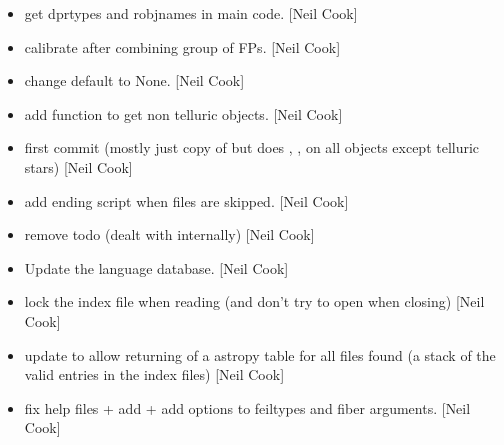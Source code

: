 \documentclass[a4paper,10pt,english]{report}
\begin{document}
\begin{itemize}
\item {} 
 \sphinxhyphen{} get dprtypes and robjnames
in main code. {[}Neil Cook{]}

\item {} 
 \sphinxhyphen{} calibrate after combining group of FPs. {[}Neil
Cook{]}

\item {} 
 \sphinxhyphen{} change default to
None. {[}Neil Cook{]}

\item {} 
 \sphinxhyphen{} add function  to get non
telluric objects. {[}Neil Cook{]}

\item {} 
 \sphinxhyphen{} first commit (mostly just
copy of  but does , ,
 on all objects except telluric stars) {[}Neil Cook{]}

\item {} 
 \sphinxhyphen{} add ending script when files
are skipped. {[}Neil Cook{]}

\item {} 
 \sphinxhyphen{} remove todo (dealt with
internally) {[}Neil Cook{]}

\item {} 
Update the language database. {[}Neil Cook{]}

\item {} 
 \sphinxhyphen{} lock the index file when reading (and don’t try
to open when closing) {[}Neil Cook{]}

\item {} 
 \sphinxhyphen{} update  to allow returning of a astropy
table for all files found (a stack of the valid entries in the index
files) {[}Neil Cook{]}

\item {} 
 \sphinxhyphen{} fix help files + add
 + add options to feiltypes and fiber arguments. {[}Neil
Cook{]}


\end{itemize}
\end{document}
